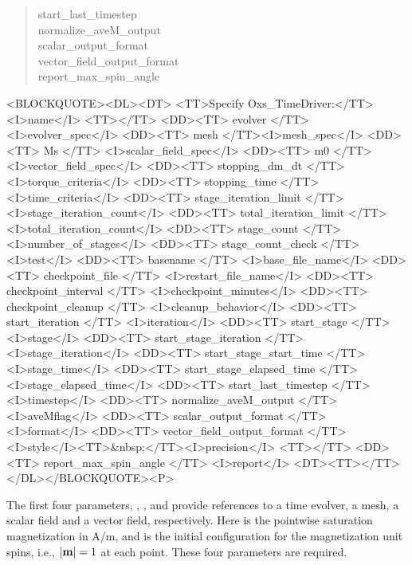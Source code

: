 \begin{description}
\begin{latexonly}
\begin{quote}
 \bi start\_last\_timestep \\
 \bi normalize\_aveM\_output \\
 \bi scalar\_output\_format \\
 \bi vector\_field\_output\_format \ocb{}\ccb\\
 \bi report\_max\_spin\_angle \\
\ccb
\end{quote}
\end{latexonly}
\begin{rawhtml}<BLOCKQUOTE><DL><DT>
<TT>Specify Oxs_TimeDriver:</TT><I>name</I> <TT>{</TT>
<DD><TT> evolver </TT><I>evolver_spec</I>
<DD><TT> mesh </TT><I>mesh_spec</I>
<DD><TT> Ms </TT> <I>scalar_field_spec</I>
<DD><TT> m0 </TT> <I>vector_field_spec</I>
<DD><TT> stopping_dm_dt </TT><I>torque_criteria</I>
<DD><TT> stopping_time </TT><I>time_criteria</I>
<DD><TT> stage_iteration_limit </TT><I>stage_iteration_count</I>
<DD><TT> total_iteration_limit </TT><I>total_iteration_count</I>
<DD><TT> stage_count </TT><I>number_of_stages</I>
<DD><TT> stage_count_check </TT><I>test</I>
<DD><TT> basename </TT> <I>base_file_name</I>
<DD><TT> checkpoint_file </TT> <I>restart_file_name</I>
<DD><TT> checkpoint_interval </TT> <I>checkpoint_minutes</I>
<DD><TT> checkpoint_cleanup </TT> <I>cleanup_behavior</I>
<DD><TT> start_iteration </TT> <I>iteration</I>
<DD><TT> start_stage </TT> <I>stage</I>
<DD><TT> start_stage_iteration </TT> <I>stage_iteration</I>
<DD><TT> start_stage_start_time </TT> <I>stage_time</I>
<DD><TT> start_stage_elapsed_time </TT> <I>stage_elapsed_time</I>
<DD><TT> start_last_timestep </TT> <I>timestep</I>
<DD><TT> normalize_aveM_output </TT> <I>aveMflag</I>
<DD><TT> scalar_output_format </TT> <I>format</I>
<DD><TT> vector_field_output_format
       {</TT> <I>style</I><TT>&nbsp;</TT><I>precision</I> <TT>}</TT>
<DD><TT> report_max_spin_angle </TT> <I>report</I>
<DT><TT>}</TT></DL></BLOCKQUOTE><P>
\end{rawhtml}
The first four parameters, , ,
 and  provide references to a time evolver, a
mesh, a scalar field and a vector field, respectively.  Here  is
the pointwise saturation magnetization in A/m, and  is the
initial configuration for the magnetization unit spins, i.e., $|\textbf{m}|=1$
at each point.  These four parameters are required.


\end{description}
